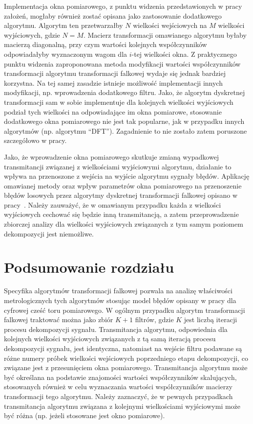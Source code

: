 Implementacja okna pomiarowego, z punktu widzenia przedstawionych w pracy założeń, mogłaby również zostać opisana jako zastosowanie dodatkowego algorytmu. Algorytm ten przetwarzałby $N$ wielkości wejściowych na $M$ wielkości wyjściowych, gdzie $N = M$. Macierz transformacji omawianego algorytmu byłaby macierzą diagonalną, przy czym wartości kolejnych współczynników odpowiadałyby wyznaczonym wagom dla $i$-tej wielkości okna. Z praktycznego punktu widzenia zaproponowana metoda modyfikacji wartości współczynników transformacji algorytmu transformacji falkowej wydaje się jednak bardziej korzystna. Na tej samej zasadzie istnieje możliwość implementacji innych modyfikacji, np. wprowadzenia dodatkowego filtru. Jako, że algorytm dyskretnej transformacji sam w sobie implementuje dla kolejnych wielkości wyjściowych podział tych wielkości na odpowiadające im okna pomiarowe, stosowanie dodatkowego okna pomiarowego nie jest tak popularne, jak w przypadku innych algorytmów (np. algorytmu \enquote{DFT}). Zagadnienie to nie zostało zatem poruszone szczegółowo w pracy.

Jako, że wprowadzenie okna pomiarowego skutkuje zmianą wypadkowej transmitancji związanej z wielkościami wyjściowymi algorytmu, działanie to wpływa na przenoszone z wejścia na wyjście algorytmu sygnały błędów. Aplikację omawianej metody oraz wpływ parametrów okna pomiarowego na przenoszenie błędów losowych przez algorytmy dyskretnej transformacji falkowej opisano w pracy~\cite{auth_window}. Należy zauważyć, że w omawianym przypadku każda z wielkości wyjściowych cechować się będzie inną transmitancją, a zatem przeprowadzenie zbiorczej analizy dla wielkości wyjściowych związanych z tym samym poziomem dekompozycji jest niemożliwe.

\section{Podsumowanie rozdziału}

Specyfika algorytmów transformacji falkowej pozwala na analizę właściwości metrologicznych tych algorytmów stosując model błędów opisany w pracy dla cyfrowej cześć toru pomiarowego. W ogólnym przypadku algorytm transformacji falkowej traktować można jako zbiór $K+1$ filtrów, gdzie $K$ jest liczbą iteracji procesu dekompozycji sygnału. Transmitancja algorytmu, odpowiednia dla kolejnych wielkości wyjściowych związanych z tą samą iteracją procesu dekompozycji sygnału, jest identyczna, natomiast na wejście filtru podawane są różne numery próbek wielkości wejściowych poprzedniego etapu dekompozycji, co związane jest z przesunięciem okna pomiarowego. Transmitancja algorytmu może być określana na podstawie znajomości wartości współczynników skalujących, stosowanych również w celu wyznaczania wartości współczynników macierzy transformacji tego algorytmu. Należy zaznaczyć, że w pewnych przypadkach transmitancja algorytmu związana z kolejnymi wielkościami wyjściowymi może być różna (np. jeżeli stosowane jest okno pomiarowe).

